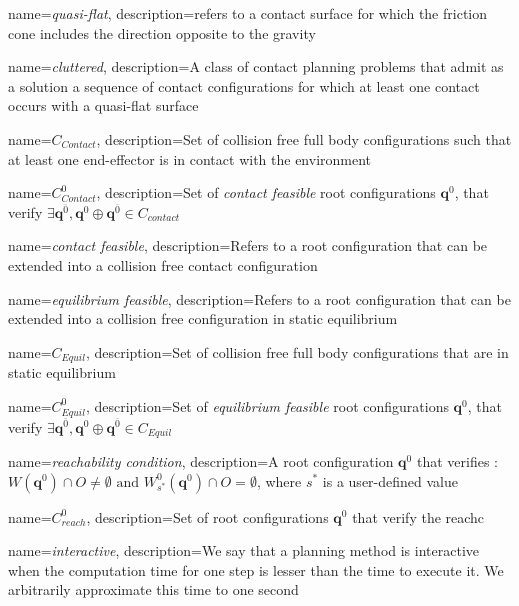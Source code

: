 {
  name=\textit{quasi-flat},
  description={refers to a contact surface for which the friction cone includes the direction opposite to the gravity}
}

{
  name=\textit{cluttered},
  description={A class of contact planning problems that admit as a solution a sequence of contact configurations for which at least one contact occurs with a \gls{quasi-flat} surface}
}

{
  name=$C_{Contact}$,
  description={Set of collision free full body configurations such that at least one end-effector is in contact with the environment}
}

{
  name=$C_{Contact}^0$,
  description={Set of \textit{contact feasible} root configurations $\mathbf{q}^{0}$, that verify $\exists \mathbf{q}^{\overline{0}},  \mathbf{q}^{0} \oplus \mathbf{q}^{\overline{0}} \in C_{contact}$}
}

{
  name=\textit{contact feasible},
  description={Refers to a root configuration that can be extended into a collision free contact configuration}
}

{
  name=\textit{equilibrium feasible},
  description={Refers to a root configuration that can be extended into a collision free configuration in static equilibrium}
}


{
  name=$C_{Equil}$,
  description={Set of collision free full body configurations that are in static equilibrium}
}

{
  name=$C_{Equil}^0$,
  description={Set of \textit{equilibrium feasible} root configurations $\mathbf{q}^{0}$, that verify $\exists \mathbf{q}^{\overline{0}},  \mathbf{q}^{0} \oplus \mathbf{q}^{\overline{0}} \in C_{Equil}$}
}

{
  name=\textit{reachability condition},
  description={A root configuration $\mathbf{q}^{0}$ that verifies :\\ $W(\mathbf{q}^{0}) \cap O \neq \emptyset \text{ and } W^0_{s^*}(\mathbf{q}^{0}) \cap O = \emptyset$,
  where $s^*$ is a user-defined value}
}

{
  name=$C_{reach}^0$,
  description={Set of root configurations  $\mathbf{q}^{0}$ that verify the \gls{reachc}}
}

{
  name=\textit{interactive},
  description={We say that a planning method is interactive when the computation time for one step is lesser than the
time to execute it. We arbitrarily approximate this time to one second}
}
